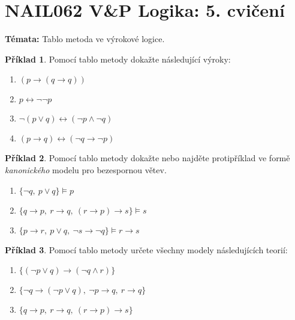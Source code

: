 \documentclass[a4paper]{article}
\theoremstyle{definition}
\newtheorem{problem}{Příklad}
\begin{document}
\section*{NAIL062 V\&P Logika: 5. cvičení}


\textbf{Témata:} 
Tablo metoda ve výrokové logice. 


\medskip\begin{problem}
    Pomocí tablo metody dokažte následující výroky:
    \begin{enumerate}
    \item $(p\to (q \to q))$
    \item $p \leftrightarrow \neg \neg  p$
    \item $\neg (p \vee q) \leftrightarrow (\neg p \wedge \neg q)$
    \item $(p \to q) \leftrightarrow (\neg q \to \neg p)$    
    \end{enumerate}
\end{problem} 
   

\medskip\begin{problem}
    Pomocí tablo metody dokažte nebo najděte protipříklad ve formě \emph{kanonického} modelu pro bezespornou větev.
    \begin{enumerate}
    \item $\{ \neg q,\ p \vee q\} \models p$
    \item $\{ q \to p,\ r \to q,\ (r \to p) \to s\} \models s$
    \item $\{ p \to r,\ p \vee q,\ \neg s \to \neg q\} \models r \to s$
    \end{enumerate}
\end{problem}
  

\medskip\begin{problem}
    Pomocí tablo metody určete všechny modely následujících teorií:
    \begin{enumerate}
    \item $\{(\neg p \vee q) \to (\neg q \wedge r)\}$
    \item $\{\neg q \to (\neg p \vee q),\ \neg p \to q,\ r \to q\}$
    \item $\{ q \to p,\ r \to q,\ (r \to p) \to s\}$
    \end{enumerate}
\end{problem}
\end{document}
